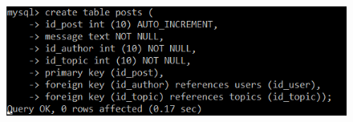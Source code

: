 \documentclass[a4paper,14pt]{extarticle}
\begin{document}
\begin{figure}[h!]
	\centering
	\includegraphics[width=0.6\linewidth]{images/create-posts}
	\caption{}
	\label{fig:create-posts}
\end{figure}
\end{document}
